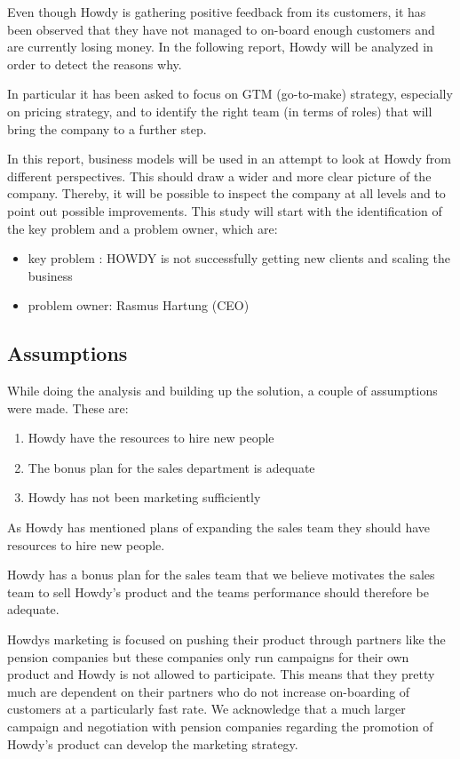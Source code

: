 \noindent Even though Howdy is gathering positive feedback from its customers, it has been observed that they have not managed to on-board enough customers and are currently losing money. In the following report, Howdy will be analyzed in order to detect the reasons why.

\noindent In particular it has been asked to focus on GTM (go-to-make) strategy, especially on pricing strategy, and to identify the right team (in terms of roles) that will bring the company to a further step.\cite[s.39]{oneofthepresentations}

\noindent In this report, business models will be used in an attempt to look at Howdy from different perspectives. This should draw a wider and more clear picture of the company. Thereby, it will be possible to inspect the company at all levels and to point out possible improvements. This study will start with the identification of the key problem and a problem owner, which are:


\begin{itemize}
  \item key problem : HOWDY is not successfully getting new clients and scaling the business\cite[s.38]{oneofthepresentations}
  \item problem owner: Rasmus Hartung (CEO)\cite[s.5]{oneofthepresentations}
\end{itemize}





\subsection{Assumptions}

While doing the analysis and building up the solution, a couple of assumptions were made. These are:

\begin{enumerate}
    \item Howdy have the resources to hire new people 
    \item The bonus plan for the sales department is adequate 
    \item Howdy has not been marketing sufficiently 
\end{enumerate}

\noindent As Howdy has mentioned plans of expanding the sales team they should have resources to hire new people.

\noindent Howdy has a bonus plan for the sales team that we believe motivates the sales team to sell Howdy’s product and the teams performance should therefore be adequate.

\noindent Howdys marketing is focused on pushing their product through partners like the pension companies but these companies only run campaigns for their own product and Howdy is not allowed to participate. This means that they pretty much are dependent on their partners who do not increase on-boarding of customers at a particularly fast rate. We acknowledge that a much larger campaign and negotiation with pension companies regarding the promotion of Howdy’s product can develop the marketing strategy.
